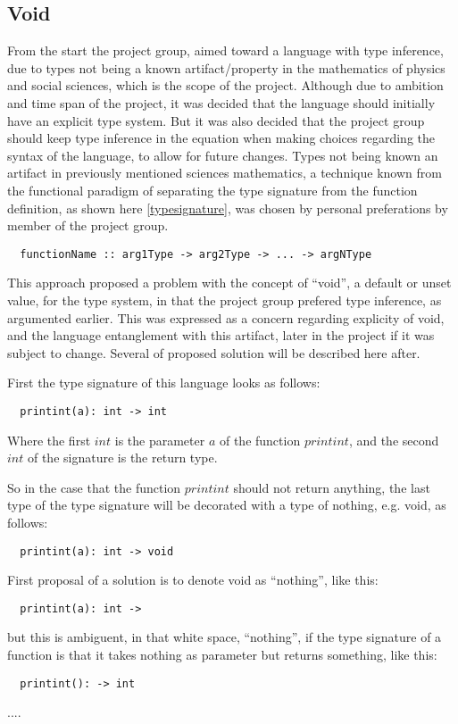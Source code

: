 \subsection{Void}
\label{sub:void}

From the start the project group, aimed toward a language with type inference, due to types not being a known artifact/property in the mathematics of physics and social sciences, which is the scope of the project. Although due to ambition and time span of the project, it was decided that the language should initially have an explicit type system. But it was also decided that the project group should keep type inference in the equation when making choices regarding the syntax of the language, to allow for future changes. %
Types not being known an artifact in previously mentioned sciences mathematics, a technique known from the functional paradigm of separating the type signature from the function definition, as shown here \cref{typesignature}, was chosen by personal preferations by member of the project group.

\begin{verbatim}
  functionName :: arg1Type -> arg2Type -> ... -> argNType
\end{verbatim}
\label{typesignature}

This approach proposed a problem with the concept of \enquote{void}, a default or unset value, for the type system, in that the project group prefered type inference, as argumented earlier. This was expressed as a concern regarding explicity of void, and the language entanglement with this artifact, later in the project if it was subject to change. Several of proposed solution will be described here after.

First the type signature of this language looks as follows:
\begin{verbatim}
  printint(a): int -> int
\end{verbatim}
Where the first $int$ is the parameter $a$ of the function $printint$, and the second $int$ of the signature is the return type.

So in the case that the function $printint$ should not return anything, the last type of the type signature will be decorated with a type of nothing, e.g. void, as follows:
\begin{verbatim}
  printint(a): int -> void
\end{verbatim}

First proposal of a solution is to denote void as \enquote{nothing}, like this:
\begin{verbatim}
  printint(a): int ->
\end{verbatim}
but this is ambiguent, in that white space, \enquote{nothing}, if the type signature of a function is that it takes nothing as parameter but returns something, like this:
\begin{verbatim}
  printint(): -> int
\end{verbatim}
.... %

